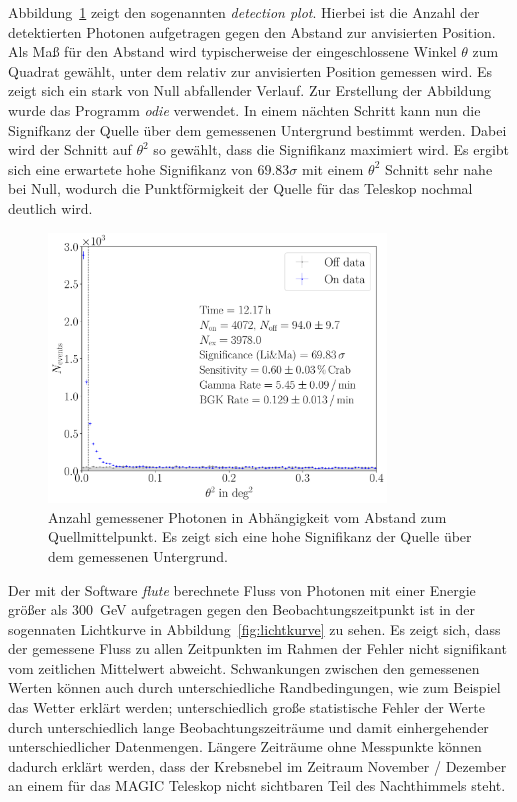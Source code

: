 Abbildung~\ref{fig:detectionplot} zeigt den sogenannten \textit{detection plot}.
Hierbei ist die Anzahl der detektierten Photonen aufgetragen gegen den Abstand
zur anvisierten Position. Als Maß für den Abstand wird typischerweise
der eingeschlossene Winkel $\theta$ zum Quadrat gewählt, unter dem relativ zur
anvisierten Position gemessen wird. Es zeigt sich ein stark von Null
abfallender Verlauf. Zur Erstellung der Abbildung wurde das Programm
\textit{odie} verwendet. In einem nächten Schritt kann nun die Signifkanz der
Quelle über dem gemessenen Untergrund bestimmt werden. Dabei wird der Schnitt
auf $\theta^2$ so gewählt, dass die Signifikanz maximiert wird. Es ergibt sich
eine erwartete hohe Signifikanz von $\num{69.83}\sigma$ mit einem $\theta^2$
Schnitt sehr nahe bei Null, wodurch die Punktförmigkeit der Quelle für das
Teleskop nochmal deutlich wird.

\begin{figure}[H]
  \centering
  \includegraphics[width=0.8\textwidth]{figures/odie_thetasquared.pdf}
  \caption{Anzahl gemessener Photonen in Abhängigkeit vom Abstand zum
  Quellmittelpunkt. Es zeigt sich eine hohe Signifikanz der Quelle über dem
  gemessenen Untergrund.}
  \label{fig:detectionplot}
\end{figure}

Der mit der Software \textit{flute} berechnete Fluss von Photonen mit einer
Energie größer als \SI{300}{\giga\electronvolt} aufgetragen gegen den
Beobachtungszeitpunkt ist in der sogennaten Lichtkurve in
Abbildung~\ref{fig:lichtkurve} zu sehen. Es zeigt sich, dass der gemessene Fluss
zu allen Zeitpunkten im Rahmen der Fehler nicht signifikant vom zeitlichen
Mittelwert abweicht. Schwankungen zwischen den gemessenen Werten können
auch durch unterschiedliche Randbedingungen, wie zum Beispiel das Wetter erklärt
werden; unterschiedlich große statistische Fehler der Werte durch
unterschiedlich lange Beobachtungszeiträume und damit einhergehender
unterschiedlicher Datenmengen. Längere Zeiträume ohne Messpunkte können dadurch
erklärt werden, dass der Krebsnebel im Zeitraum November / Dezember an einem für
das MAGIC Teleskop nicht sichtbaren Teil des Nachthimmels steht.

